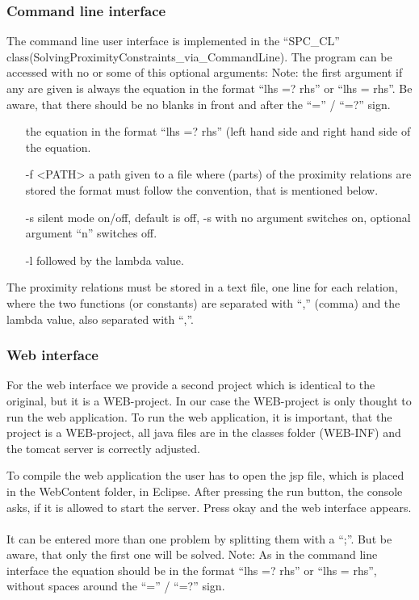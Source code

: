 \documentclass{article}
\begin{document}
\subsubsection{Command line interface}
The command line user interface is implemented in the ``SPC\_CL'' class(SolvingProximityConstraints\_via\_CommandLine). The program can be accessed with no or some of this optional arguments:
Note: the first argument if any are given is always the equation in the format ``lhs =? rhs'' or ``lhs = rhs''. Be aware, that there should be no blanks in front and after the ``='' / ``=?'' sign.
\begin{itemize}
	\item [] the equation in the format ``lhs =? rhs'' (left hand side and right hand side of the equation.
	\item [-f] <PATH> a path given to a file where (parts) of the proximity relations are stored the format must follow the convention, that is mentioned below.
	\item [-s] silent mode on/off, default is off, -s with no argument switches on, optional argument ``n'' switches off.
	\item [-l] followed by the lambda value.
\end{itemize}

The proximity relations must be stored in a text file, one line for each relation, where the two functions (or constants) are separated with ``,'' (comma) and the lambda value, also separated with ``,''.

\subsubsection{Web interface}
For the web interface we provide a second project which is identical to the original, but it is a WEB-project. In our case the WEB-project is only thought to run the web application. To run the web application, it is important, that the project is a WEB-project, all java files are in the classes folder (WEB-INF) and the tomcat server is correctly adjusted.

 To compile the web application the user has to open the jsp file, which is placed in the WebContent folder, in Eclipse. After pressing the run button, the console asks, if it is allowed to start the server. Press okay and the web interface appears.\\
\\
It can be entered more than one problem by splitting them with a ``;''. But be aware, that only the first one will be solved.
Note: As in the command line interface the equation should be in the format ``lhs =? rhs'' or ``lhs = rhs'', without spaces around the ``='' / ``=?'' sign. 
\end{document}
